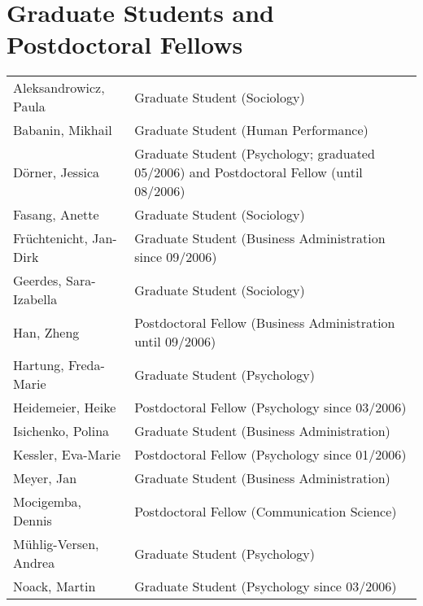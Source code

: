 \section{Graduate Students and Postdoctoral Fellows}

\begin{tabular}{lp{8cm}}
Aleksandrowicz, Paula	&	Graduate Student (Sociology)\\[0.8ex]

Babanin, Mikhail		&	Graduate Student (Human Performance)\\[0.8ex]

D\"orner, Jessica	& Graduate Student (Psychology; graduated 05/2006) and Postdoctoral Fellow (until 08/2006) \\[0.8ex]

Fasang, Anette		&	Graduate Student (Sociology)\\[0.8ex]

Fr\"uchtenicht, Jan-Dirk	&	Graduate Student (Business Administration since 09/2006)\\[0.8ex]

Geerdes, Sara-Izabella	&	Graduate Student (Sociology)\\[0.8ex]

Han, Zheng		&		Postdoctoral Fellow (Business Administration until 09/2006)\\[0.8ex]

Hartung, Freda-Marie			& Graduate Student (Psychology)\\[0.8ex]

Heidemeier, Heike		&	Postdoctoral Fellow (Psychology since 03/2006)\\[0.8ex]

Isichenko, Polina		&	Graduate Student (Business Administration)\\[0.8ex]

Kessler, Eva-Marie	& Postdoctoral Fellow (Psychology since 01/2006)\\[0.8ex]

Meyer, Jan			&	Graduate Student (Business Administration)\\[0.8ex]

Mocigemba, Dennis	&		Postdoctoral Fellow (Communication Science)\\[0.8ex]

M\"uhlig-Versen, Andrea	&	Graduate Student (Psychology)\\[0.8ex]

Noack, Martin		&		Graduate Student (Psychology since 03/2006)\\[0.8ex]


\end{tabular}
